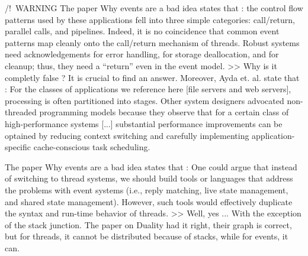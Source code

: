 




/!\ WARNING
The paper Why events are a bad idea states that :
the control flow patterns used by these applications fell into three simple categories: call/return, parallel calls, and pipelines.
Indeed, it is no coincidence that common event patterns map cleanly onto the call/return mechanism of threads. Robust systems need acknowledgements for error handling, for storage deallocation, and for cleanup; thus, they need a “return” even in the event model.
>> Why is it completly false ?
	 It is crucial to find an answer.
Moreover, Ayda et. al. state that :
For the classes of applications we reference here [file servers and web servers], processing is often partitioned into stages.
Other system designers advocated non-threaded programming models because they observe that for a certain class of high-performance systems [...] substantial performance improvements can be optained by reducing context switching and carefully implementing application-specific cache-conscious task scheduling.


The paper Why events are a bad idea states that :
One could argue that instead of switching to thread systems, we should build tools or languages that address the problems with event systems (i.e., reply matching, live state management, and shared state management). However, such tools would effectively duplicate the syntax and run-time behavior of threads.
>> Well, yes ...
   With the exception of the stack junction.
   The paper on Duality had it right, their graph is correct, but for threads, it cannot be distributed because of stacks, while for events, it can.


